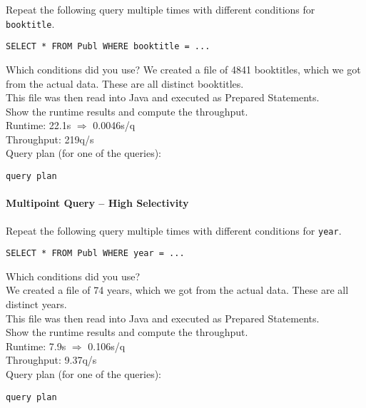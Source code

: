\documentclass[11pt]{scrartcl}
\begin{document}
Repeat the following query multiple times with different conditions for {\tt booktitle}.

{\small
\begin{verbatim}
SELECT * FROM Publ WHERE booktitle = ...
\end{verbatim}
}

\noindent
Which conditions did you use?
We created a file of 4841 booktitles, which we got from the actual data. These are all distinct booktitles.\\
This file was then read into Java and executed as Prepared Statements.\\

\smallskip\noindent
Show the runtime results and compute the throughput.\\
Runtime: 22.1s $\Rightarrow$ 0.0046s/q\\
Throughput: 219q/s\\

\smallskip\noindent
Query plan (for one of the queries):
{\small
\begin{verbatim}
query plan
\end{verbatim}
}


\paragraph{Multipoint Query -- High Selectivity}

Repeat the following query multiple times with different conditions for {\tt year}.

{\small
\begin{verbatim}
SELECT * FROM Publ WHERE year = ...
\end{verbatim}
}

\noindent
Which conditions did you use?\\
We created a file of 74 years, which we got from the actual data. These are all distinct years.\\
This file was then read into Java and executed as Prepared Statements.\\

\smallskip\noindent
Show the runtime results and compute the throughput.\\
Runtime: 7.9s $\Rightarrow$ 0.106s/q\\
Throughput: 9.37q/s\\

\smallskip\noindent
Query plan (for one of the queries):
{\small
\begin{verbatim}
query plan
\end{verbatim}
}
\end{document}
